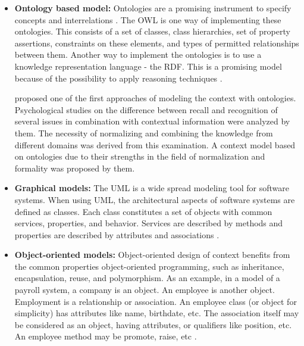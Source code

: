 \begin{itemize}
\item \textbf{Ontology based model: }
Ontologies are a promising instrument to specify concepts and interrelations \cite{gruber_1993}. The \ac{OWL} is one way of implementing these ontologies. This consists of a set of classes, class hierarchies, set of property assertions, constraints on these elements, and types of permitted relationships between them. Another way to implement the ontologies is to use a knowledge representation language - the \ac{RDF}. This is a promising model because of the possibility to apply reasoning techniques \cite{Riva04}.  

\citeauthor{Oeztuerk97towardsa} proposed one of the first approaches of modeling the context with ontologies. Psychological studies on the difference between recall and recognition of several issues in combination with contextual information were analyzed by them. The necessity of normalizing and combining the knowledge from different domains was derived from this examination. A context model based on ontologies due to their strengths in the field of normalization and formality was proposed by them.

\item \textbf{Graphical models:} 
The \ac{UML} is a wide spread modeling tool for software systems. When using \ac{UML}, the architectural aspects of software systems are defined as classes. Each class constitutes a set of objects with common services, properties, and behavior. Services are described by methods and properties are described by attributes and associations \cite{Sheng2005}.



\item \textbf{Object-oriented models:} Object-oriented design of context benefits from the common properties object-oriented programming, such as inheritance, encapsulation, reuse, and polymorphism. As an example, in a model of a payroll system, a company is an object. An employee is another object. Employment is a relationship or association. An employee class (or object for simplicity) has attributes like name, birthdate, etc. The association itself may be considered as an object, having attributes, or qualifiers like position, etc. An employee method may be promote, raise, etc \cite{pSkills:Object-oriented_modeling}.


\end{itemize}
